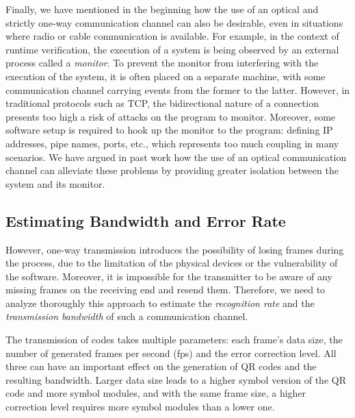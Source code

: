 \begin{comment}
Preliminary experiments show the technique can work on an inexpensive webcam with a low resolution of $640\times480$ (0.3 megapixels).
\end{comment}

Finally, we have mentioned in the beginning how the use of an optical and strictly one-way communication channel can also be desirable, even in situations where radio or cable communication is available. For example, in the context of runtime verification, the execution of a system is being observed by an external  process called a \emph{monitor}. To prevent the monitor from interfering with the execution of the system, it is often placed on a separate machine, with some communication channel carrying events from the former to the latter. However, in traditional protocols such as TCP, the bidirectional nature of a connection presents too high a risk of attacks on the program to monitor. Moreover, some software setup is required to hook up the monitor to the program: defining IP addresses, pipe names, ports, etc., which represents too much coupling in many scenarios. We have argued in past work \cite{DBLP_conf/rv/LavoieLVGH14} how the use of an optical communication channel can alleviate these problems by providing greater isolation between the system and its monitor.

\subsection{Estimating Bandwidth and Error Rate}

However, one-way transmission introduces the possibility of losing frames during the process, due to the limitation of the physical devices or the vulnerability of the software. Moreover, it is impossible for the transmitter to be aware of any missing frames on the receiving end and resend them. Therefore, we need to analyze thoroughly this approach to estimate the \emph{recognition rate} and the \emph{transmission bandwidth} of such a communication channel.

The transmission of codes takes multiple parameters: each frame's data size, the number of generated frames per second (fps) and the error correction level. All three can have an important effect on the generation of QR codes and the resulting bandwidth. Larger data size leads to a higher symbol version of the QR code and more symbol modules, and with the same frame size, a higher correction level requires more symbol modules than a lower one.

